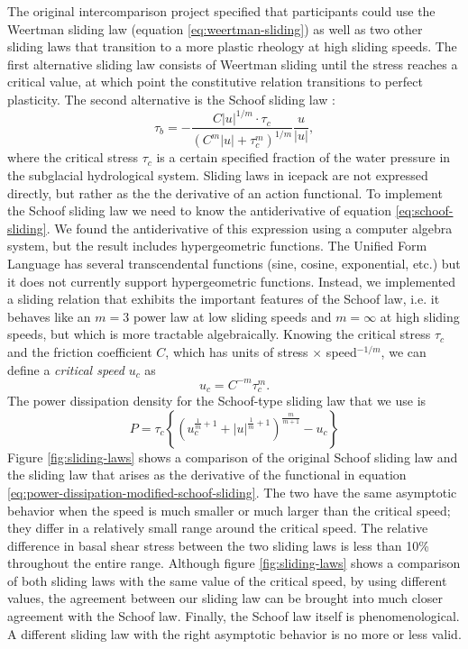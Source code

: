 \documentclass[journal abbreviation, manuscript]{copernicus}
\begin{document}
The original intercomparison project specified that participants could use the Weertman sliding law (equation \eqref{eq:weertman-sliding}) as well as two other sliding laws that transition to a more plastic rheology at high sliding speeds.
The first alternative sliding law consists of Weertman sliding until the stress reaches a critical value, at which point the constitutive relation transitions to perfect plasticity.
The second alternative is the Schoof sliding law \citep{schoof2005effect}:
\begin{equation}
    \tau_b = -\frac{C|u|^{1/m}\cdot \tau_c}{(C^m|u| + \tau_c^m)^{1/m}}\frac{u}{|u|},
    \label{eq:schoof-sliding}
\end{equation}
where the critical stress $\tau_c$ is a certain specified fraction of the water pressure in the subglacial hydrological system.
Sliding laws in icepack are not expressed directly, but rather as the the derivative of an action functional.
To implement the Schoof sliding law we need to know the antiderivative of equation \eqref{eq:schoof-sliding}.
We found the antiderivative of this expression using a computer algebra system, but the result includes hypergeometric functions.
The Unified Form Language has several transcendental functions (sine, cosine, exponential, etc.) but it does not currently support hypergeometric functions.
Instead, we implemented a sliding relation that exhibits the important features of the Schoof law, i.e. it behaves like an $m = 3$ power law at low sliding speeds and $m = \infty$ at high sliding speeds, but which is more tractable algebraically.
Knowing the critical stress $\tau_c$ and the friction coefficient $C$, which has units of stress $\times$ speed${}^{-1/m}$, we can define a \emph{critical speed} $u_c$ as
\begin{equation}
    u_c = C^{-m}\tau_c^m.
\end{equation}
The power dissipation density for the Schoof-type sliding law that we use is
\begin{equation}
    P = \tau_c\left\{\left(u_c^{\frac{1}{m} + 1} + |u|^{\frac{1}{m} + 1}\right)^{\frac{m}{m + 1}} - u_c\right\}
    \label{eq:power-dissipation-modified-schoof-sliding}
\end{equation}
Figure \ref{fig:sliding-laws} shows a comparison of the original Schoof sliding law and the sliding law that arises as the derivative of the functional in equation \eqref{eq:power-dissipation-modified-schoof-sliding}.
The two have the same asymptotic behavior when the speed is much smaller or much larger than the critical speed; they differ in a relatively small range around the critical speed.
The relative difference in basal shear stress between the two sliding laws is less than 10\% throughout the entire range.
Although figure \ref{fig:sliding-laws} shows a comparison of both sliding laws with the same value of the critical speed, by using different values, the agreement between our sliding law can be brought into much closer agreement with the Schoof law.
Finally, the Schoof law itself is phenomenological.
A different sliding law with the right asymptotic behavior is no more or less valid.
\end{document}
